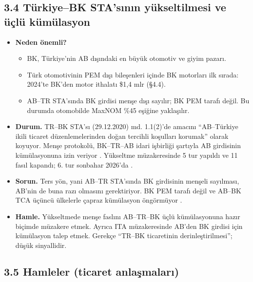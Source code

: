 \hypertarget{02c_hazirlik-34-tuxfcrkiyebk-stasux131nux131n-yuxfckseltilmesi-ve-uxfcuxe7luxfc-kuxfcmuxfclasyon}{%
\subsection{3.4 Türkiye--BK STA'sının yükseltilmesi ve üçlü kümülasyon}\label{02c_hazirlik-34-tuxfcrkiyebk-stasux131nux131n-yuxfckseltilmesi-ve-uxfcuxe7luxfc-kuxfcmuxfclasyon}}

\begin{itemize}
\tightlist
\item
  \textbf{Neden önemli?}

  \begin{itemize}
  \tightlist
  \item
    BK, Türkiye'nin AB dışındaki en büyük otomotiv ve giyim pazarı.
  \item
    Türk otomotivinin PEM dışı bileşenleri içinde BK motorları ilk sırada: 2024'te BK'den motor ithalatı \$1,4 mlr (§4.4).
  \item
    AB--TR STA'sında BK girdisi menşe dışı sayılır; BK PEM tarafı değil. Bu durumda otomobilde MaxNOM \%45 eşiğine yaklaşılır.
  \end{itemize}
\item
  \textbf{Durum.} TR--BK STA'sı (29.12.2020) md. 1.1(2)'de amacını ``AB--Türkiye ikili ticaret düzenlemelerinden doğan tercihli koşulları korumak'' olarak koyuyor. Menşe protokolü, BK--TR--AB idari işbirliği şartıyla AB girdisinin kümülasyonuna izin veriyor \etiketV{}. Yükseltme müzakeresinde 5 tur yapıldı ve 11 fasıl kapandı; 6. tur sonbahar 2026'da \etiketV{}.
\item
  \textbf{Sorun.} Ters yön, yani AB--TR STA'sında BK girdisinin menşeli sayılması, AB'nin de buna razı olmasını gerektiriyor. BK PEM tarafı değil ve AB--BK TCA üçüncü ülkelerle çapraz kümülasyon öngörmüyor \etiketH{}.
\item
  \textbf{Hamle.} Yükseltmede menşe faslını AB--TR--BK üçlü kümülasyonuna hazır biçimde müzakere etmek. Ayrıca ITA müzakeresinde AB'den BK girdisi için kümülasyon talep etmek. Gerekçe ``TR--BK ticaretinin derinleştirilmesi''; düşük sinyallidir.
\end{itemize}

\hypertarget{02c_hazirlik-35-hamleler-ticaret-anlaux15fmalarux131}{%
\subsection{3.5 Hamleler (ticaret anlaşmaları)}\label{02c_hazirlik-35-hamleler-ticaret-anlaux15fmalarux131}}

